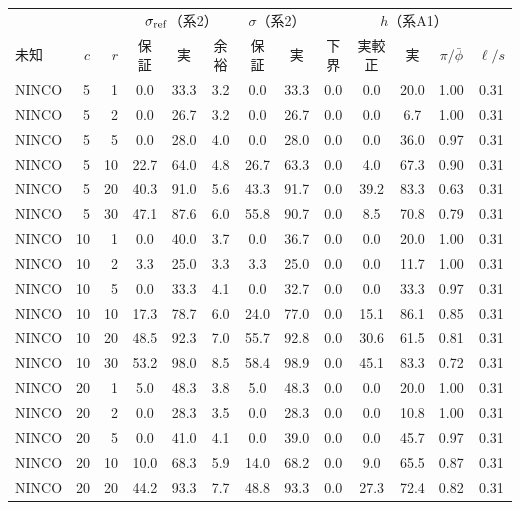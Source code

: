 {\fontsize{6.2pt}{7.2pt}\selectfont\renewcommand{\arraystretch}{1.0}%
\setlength{\tabcolsep}{2.2pt}\begin{tabular}{@{}lrr|ccc|cc|ccccc@{}}
\hline
\rule[-2.0pt]{0pt}{8.2pt} & & & \multicolumn{3}{c|}{$\sigma_{\mathrm{ref}}$（系2）} & \multicolumn{2}{c|}{$\sigma$（系2）} & \multicolumn{5}{c}{$h$（系A1）} \\
\rule[-2.0pt]{0pt}{8.2pt}未知 & $c$ & $r$ & 保証 & 実 & 余裕 & 保証 & 実 & 下界 & 実較正 & 実 & $\pi/\bar\phi$ & $\ell/s$ \\
\hline
NINCO & 5 & 1 & 0.0 & 33.3 & 3.2 & 0.0 & 33.3 & 0.0 & 0.0 & 20.0 & 1.00 & 0.31 \\
NINCO & 5 & 2 & 0.0 & 26.7 & 3.2 & 0.0 & 26.7 & 0.0 & 0.0 & 6.7 & 1.00 & 0.31 \\
NINCO & 5 & 5 & 0.0 & 28.0 & 4.0 & 0.0 & 28.0 & 0.0 & 0.0 & 36.0 & 0.97 & 0.31 \\
NINCO & 5 & 10 & 22.7 & 64.0 & 4.8 & 26.7 & 63.3 & 0.0 & 4.0 & 67.3 & 0.90 & 0.31 \\
NINCO & 5 & 20 & 40.3 & 91.0 & 5.6 & 43.3 & 91.7 & 0.0 & 39.2 & 83.3 & 0.63 & 0.31 \\
NINCO & 5 & 30 & 47.1 & 87.6 & 6.0 & 55.8 & 90.7 & 0.0 & 8.5 & 70.8 & 0.79 & 0.31 \\
NINCO & 10 & 1 & 0.0 & 40.0 & 3.7 & 0.0 & 36.7 & 0.0 & 0.0 & 20.0 & 1.00 & 0.31 \\
NINCO & 10 & 2 & 3.3 & 25.0 & 3.3 & 3.3 & 25.0 & 0.0 & 0.0 & 11.7 & 1.00 & 0.31 \\
NINCO & 10 & 5 & 0.0 & 33.3 & 4.1 & 0.0 & 32.7 & 0.0 & 0.0 & 33.3 & 0.97 & 0.31 \\
NINCO & 10 & 10 & 17.3 & 78.7 & 6.0 & 24.0 & 77.0 & 0.0 & 15.1 & 86.1 & 0.85 & 0.31 \\
NINCO & 10 & 20 & 48.5 & 92.3 & 7.0 & 55.7 & 92.8 & 0.0 & 30.6 & 61.5 & 0.81 & 0.31 \\
NINCO & 10 & 30 & 53.2 & 98.0 & 8.5 & 58.4 & 98.9 & 0.0 & 45.1 & 83.3 & 0.72 & 0.31 \\
NINCO & 20 & 1 & 5.0 & 48.3 & 3.8 & 5.0 & 48.3 & 0.0 & 0.0 & 20.0 & 1.00 & 0.31 \\
NINCO & 20 & 2 & 0.0 & 28.3 & 3.5 & 0.0 & 28.3 & 0.0 & 0.0 & 10.8 & 1.00 & 0.31 \\
NINCO & 20 & 5 & 0.0 & 41.0 & 4.1 & 0.0 & 39.0 & 0.0 & 0.0 & 45.7 & 0.97 & 0.31 \\
NINCO & 20 & 10 & 10.0 & 68.3 & 5.9 & 14.0 & 68.2 & 0.0 & 9.0 & 65.5 & 0.87 & 0.31 \\
NINCO & 20 & 20 & 44.2 & 93.3 & 7.7 & 48.8 & 93.3 & 0.0 & 27.3 & 72.4 & 0.82 & 0.31 \\

\end{tabular}}

